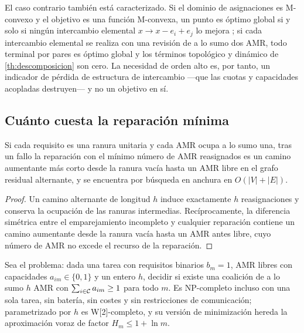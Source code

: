 \begin{observacion}
\label{obs:m-convexo}
El caso contrario también está caracterizado. Si el dominio de asignaciones es
M-convexo y el objetivo es una función M-convexa, un punto es óptimo global si
y solo si ningún intercambio elemental $x\to x-e_i+e_j$ lo mejora
\cite{murota2003discrete}; si cada intercambio elemental se realiza con una
revisión de a lo sumo dos AMR, todo terminal por pares es óptimo global y los
términos topológico y dinámico de \cref{th:descomposicion} son cero. La
necesidad de orden alto es, por tanto, un indicador de pérdida de estructura
de intercambio —que las cuotas y capacidades acopladas destruyen— y no un
objetivo en sí.
\end{observacion}

\subsection{Cuánto cuesta la reparación mínima}

\begin{proposicion}
\label{pr:reparacion-ranuras}
Si cada requisito es una ranura unitaria y cada AMR ocupa a lo sumo una, tras
un fallo la reparación con el mínimo número de AMR reasignados es un camino
aumentante más corto desde la ranura vacía hasta un AMR libre en el grafo
residual alternante, y se encuentra por búsqueda en anchura en
$O(|V|+|E|)$.
\end{proposicion}

\begin{proof}
Un camino alternante de longitud $h$ induce exactamente $h$ reasignaciones y
conserva la ocupación de las ranuras intermedias. Recíprocamente, la
diferencia simétrica entre el emparejamiento incompleto y cualquier reparación
contiene un camino aumentante desde la ranura vacía hasta un AMR antes libre,
cuyo número de AMR no excede el recurso de la reparación.
\end{proof}

\begin{teorema}
\label{th:mohr}
Sea el problema: dada una tarea con requisitos binarios $b_m=1$, AMR libres
con capacidades $a_{im}\in\{0,1\}$ y un entero $h$, decidir si existe una
coalición de a lo sumo $h$ AMR con $\sum_{i\in\mathcal{C}}a_{im}\ge1$ para todo $m$.
Es NP-completo incluso con una sola tarea, sin batería, sin costes y sin
restricciones de comunicación; parametrizado por $h$ es W[2]-completo, y su
versión de minimización hereda la aproximación voraz de factor
$H_m\le1+\ln m$.
\end{teorema}

